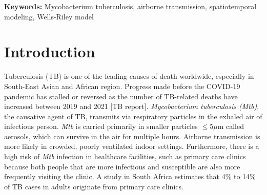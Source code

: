 \documentclass[fleqn,11pt]{wlscirep}
\begin{document}
\vspace{2em}


\vspace{0.5em}

\noindent\textbf{Keywords:} Mycobacterium tuberculosis, airborne transmission, spatiotemporal modeling, Wells-Riley model
\newpage

\sloppy
\raggedbottom

\newpage

\section{Introduction} 

Tuberculosis (TB) is one of the leading causes of death worldwide, especially in South-East Asian and African region\cite{WHO2022TBReport}. Progress made before the COVID-19 pandemic has stalled or reversed as the number of TB-related deaths have increased between 2019 and 2021 [TB report]. \emph{Mycobacterium tuberculosis (Mtb)}, the causative agent of TB, transmits via respiratory particles in the exhaled air of infectious person\cite{Rieder1999,Patterson2021Tuberculosis}. \emph{Mtb} is carried primarily in smaller particles $\leq5\mu$m called aerosols\cite{Fennelly2020Lancet}, which can survive in the air for multiple hours\cite{Loudon1969AMRRD}. Airborne transmission is more likely in crowded, poorly ventilated indoor settings\cite{Rieder1999,CPS2013Book,Nardell1991ARRD,Wang2021Science,Morawska2021}. Furthermore, there is a high risk of \emph{Mtb} infection in healthcare facilities, such as primary care clinics because both people that are more infectious and susceptible are also more frequently visiting the clinic\cite{McCreesh2020IJTLD}. A study in South Africa estimates that 4\% to 14\% of TB cases in adults originate from primary care clinics\cite{McCreesh2022BMJGlobalHealth}.
\end{document}
